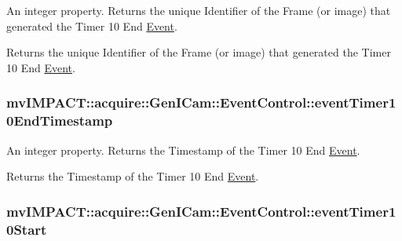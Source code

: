 An integer property. Returns the unique Identifier of the Frame (or image) that generated the Timer 10 End \hyperlink{classmv_i_m_p_a_c_t_1_1acquire_1_1_event}{Event}. 

Returns the unique Identifier of the Frame (or image) that generated the Timer 10 End \hyperlink{classmv_i_m_p_a_c_t_1_1acquire_1_1_event}{Event}. \hypertarget{classmv_i_m_p_a_c_t_1_1acquire_1_1_gen_i_cam_1_1_event_control_afc774fd94f55b5828fc6af849168d51e}{
\subsubsection[{event\+Timer10\+End\+Timestamp}]{ mv\+I\+M\+P\+A\+C\+T\+::acquire\+::\+Gen\+I\+Cam\+::\+Event\+Control\+::event\+Timer10\+End\+Timestamp}}\label{classmv_i_m_p_a_c_t_1_1acquire_1_1_gen_i_cam_1_1_event_control_afc774fd94f55b5828fc6af849168d51e}


An integer property. Returns the Timestamp of the Timer 10 End \hyperlink{classmv_i_m_p_a_c_t_1_1acquire_1_1_event}{Event}. 

Returns the Timestamp of the Timer 10 End \hyperlink{classmv_i_m_p_a_c_t_1_1acquire_1_1_event}{Event}. \hypertarget{classmv_i_m_p_a_c_t_1_1acquire_1_1_gen_i_cam_1_1_event_control_ae2d18c42859146db2718604f2277c187}{
\subsubsection[{event\+Timer10\+Start}]{ mv\+I\+M\+P\+A\+C\+T\+::acquire\+::\+Gen\+I\+Cam\+::\+Event\+Control\+::event\+Timer10\+Start}}\label{classmv_i_m_p_a_c_t_1_1acquire_1_1_gen_i_cam_1_1_event_control_ae2d18c42859146db2718604f2277c187}


